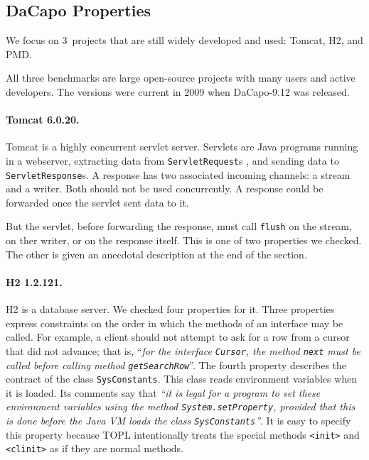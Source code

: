 \documentclass{article} %
\theoremstyle{definition}
\theoremstyle{remark}
\begin{document}
\subsection{DaCapo Properties} %
We focus on $3$~projects that are still widely developed and used:
Tomcat, H2, and PMD\null.

All three benchmarks are large open-source projects with many users and active developers.
The versions were current in 2009 when DaCapo-9.12 was released.

\paragraph{Tomcat 6.0.20.}
Tomcat is a highly concurrent servlet server. 
Servlets are Java programs running in a webserver, extracting data from {\tt ServletRequest}s , and sending data to {\tt ServletResponse}s.
A response has two associated incoming channels: a stream and a writer. Both should not be used concurrently.
A response could be forwarded once the servlet sent data to it.

But the servlet, before forwarding the response, must call {\tt flush} on the stream, on ther writer, or on the response itself.
This is one of two properties we checked. The other is given an
anecdotal description at the end of the section.


\paragraph{H2 1.2.121.}
H2 is a database server.
We checked four properties for it.
Three properties express constraints on the order in which the methods of an interface may be called.
For example, a client should not attempt to ask for a row from a cursor that did not advance;
that is, ``{\em for the interface {\tt Cursor}, the method {\tt next} must be called before calling method {\tt getSearchRow}}''.
The fourth property describes the contract of the class {\tt SysConstants}.
This class reads environment variables when it is loaded.
Its comments say that {\em ``it is legal for a program to set these environment variables using the method {\tt System.setProperty}, provided that this is done before the Java VM loads the class {\tt SysConstants}''}.
It is easy to specify this property because TOPL intentionally treats the special methods {\tt <init>} and {\tt <clinit>} as if they are normal methods.
\end{document}
